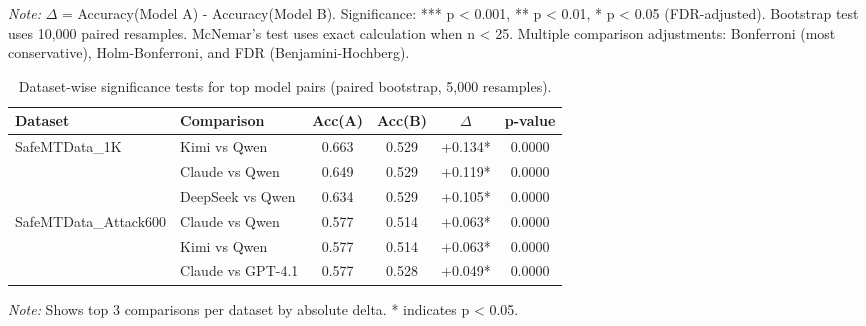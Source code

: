 \begin{table}[htbp]
{\begin{tabular}{lcccccccc}
\bottomrule
\end{tabular}
}
\vspace{2mm}
\footnotesize
\textit{Note:} $\Delta$ = Accuracy(Model A) - Accuracy(Model B). Significance: *** p < 0.001, ** p < 0.01, * p < 0.05 (FDR-adjusted).
Bootstrap test uses 10,000 paired resamples. McNemar's test uses exact calculation when n < 25.
Multiple comparison adjustments: Bonferroni (most conservative), Holm-Bonferroni, and FDR (Benjamini-Hochberg).
\end{table}



\begin{table}[htbp]
\centering
\caption{Dataset-wise significance tests for top model pairs (paired bootstrap, 5,000 resamples).}
\label{tab:dataset-significance}
\begin{tabular}{llcccc}
\toprule
Dataset & Comparison & Acc(A) & Acc(B) & $\Delta$ & p-value \\
\midrule
\midrule
\multirow{3}{*}{SafeMTData_1K} & Kimi vs Qwen & 0.663 & 0.529 & +0.134* & 0.0000 \\
 & Claude vs Qwen & 0.649 & 0.529 & +0.119* & 0.0000 \\
 & DeepSeek vs Qwen & 0.634 & 0.529 & +0.105* & 0.0000 \\
\midrule
\multirow{3}{*}{SafeMTData_Attack600} & Claude vs Qwen & 0.577 & 0.514 & +0.063* & 0.0000 \\
 & Kimi vs Qwen & 0.577 & 0.514 & +0.063* & 0.0000 \\
 & Claude vs GPT-4.1 & 0.577 & 0.528 & +0.049* & 0.0000 \\
\midrule

\bottomrule
\end{tabular}
\vspace{2mm}
\footnotesize
\textit{Note:} Shows top 3 comparisons per dataset by absolute delta. * indicates p < 0.05.
\end{table}
